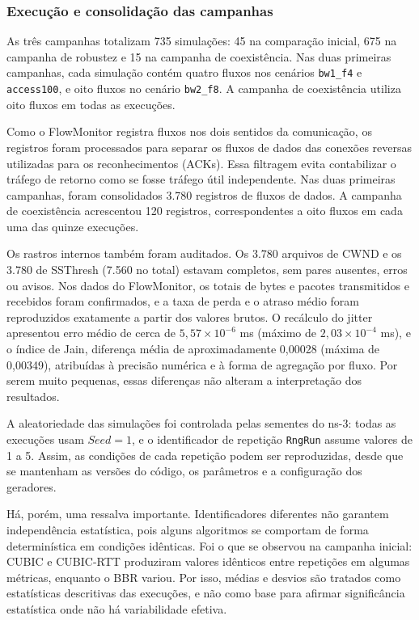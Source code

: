 \documentclass[a4paper,12pt]{monografia}
\begin{document}
\subsubsection{Execução e consolidação das campanhas}

As três campanhas totalizam 735 simulações: 45 na comparação inicial, 675 na campanha de robustez e 15 na campanha de coexistência. Nas duas primeiras campanhas, cada simulação contém quatro fluxos nos cenários \texttt{bw1\_f4} e \texttt{access100}, e oito fluxos no cenário \texttt{bw2\_f8}. A campanha de coexistência utiliza oito fluxos em todas as execuções.

Como o FlowMonitor registra fluxos nos dois sentidos da comunicação, os registros foram processados para separar os fluxos de dados das conexões reversas utilizadas para os reconhecimentos (ACKs). Essa filtragem evita contabilizar o tráfego de retorno como se fosse tráfego útil independente. Nas duas primeiras campanhas, foram consolidados 3.780 registros de fluxos de dados. A campanha de coexistência acrescentou 120 registros, correspondentes a oito fluxos em cada uma das quinze execuções.

Os rastros internos também foram auditados. Os 3.780 arquivos de CWND e os 3.780 de SSThresh (7.560 no total) estavam completos, sem pares ausentes, erros ou avisos. Nos dados do FlowMonitor, os totais de bytes e pacotes transmitidos e recebidos foram confirmados, e a taxa de perda e o atraso médio foram reproduzidos exatamente a partir dos valores brutos. O recálculo do jitter apresentou erro médio de cerca de $5{,}57\times10^{-6}$ ms (máximo de $2{,}03\times10^{-4}$ ms), e o índice de Jain, diferença média de aproximadamente 0,00028 (máxima de 0,00349), atribuídas à precisão numérica e à forma de agregação por fluxo. Por serem muito pequenas, essas diferenças não alteram a interpretação dos resultados.

A aleatoriedade das simulações foi controlada pelas sementes do ns-3: todas as execuções usam $Seed = 1$, e o identificador de repetição \texttt{RngRun} assume valores de 1 a 5. Assim, as condições de cada repetição podem ser reproduzidas, desde que se mantenham as versões do código, os parâmetros e a configuração dos geradores.

Há, porém, uma ressalva importante. Identificadores diferentes não garantem independência estatística, pois alguns algoritmos se comportam de forma determinística em condições idênticas. Foi o que se observou na campanha inicial: CUBIC e CUBIC-RTT produziram valores idênticos entre repetições em algumas métricas, enquanto o BBR variou. Por isso, médias e desvios são tratados como estatísticas descritivas das execuções, e não como base para afirmar significância estatística onde não há variabilidade efetiva.
\end{document}
